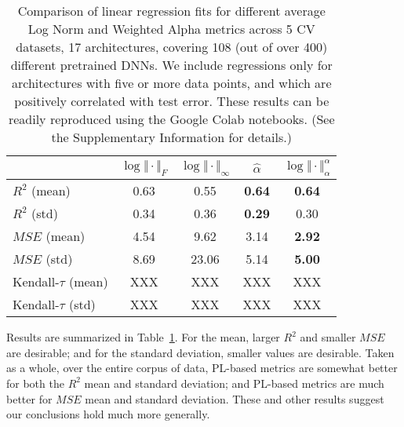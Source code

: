 \begin{table}[t]
\small
\begin{center}
\begin{tabular}{|p{1.25in}|c|c|c|c|}
\hline
                        & $\log\Vert\cdot\Vert_{F}$ & $\log\Vert\cdot\Vert_{\infty}$ & $\hat{\alpha}$ & $\log\Vert\cdot\Vert^{\alpha}_{\alpha}$ \\
\hline
$R^{2}$ (mean)          & 0.63 &  0.55 & \textbf{0.64} & \textbf{0.64} \\
$R^{2}$ (std)           & 0.34 &  0.36 & \textbf{0.29} &          0.30 \\
\hline
$MSE$ (mean)            & 4.54 &  9.62 &          3.14 & \textbf{2.92} \\
$MSE$ (std)             & 8.69 & 23.06 &          5.14 & \textbf{5.00} \\
\hline
Kendall-$\tau$ (mean)   &  XXX &   XXX &           XXX &           XXX \\
Kendall-$\tau$ (std)    &  XXX &   XXX &           XXX &           XXX \\
\hline
\end{tabular}
\end{center}
\caption{Comparison of linear regression fits for different average Log Norm and Weighted Alpha metrics across 5 CV datasets, 17 architectures, covering 108 (out of over 400) different pretrained DNNs.  
         We include regressions only for architectures with five or more data points, and which are positively correlated with test error.
         These results can be readily reproduced using the Google Colab notebooks. 
         (See the Supplementary Information
         for details.) 
        }
\label{table:results}
\end{table}


Results are summarized in Table~\ref{table:results}.
For the mean, larger $R^{2}$ and smaller $MSE$ are desirable; and for the standard deviation, smaller values are desirable.
Taken as a whole, over the entire corpus of data, PL-based metrics are somewhat better for both the $R^{2}$ mean and standard deviation;
and PL-based metrics are much better for $MSE$ mean and standard deviation.
These and other results suggest our conclusions hold much more generally.

